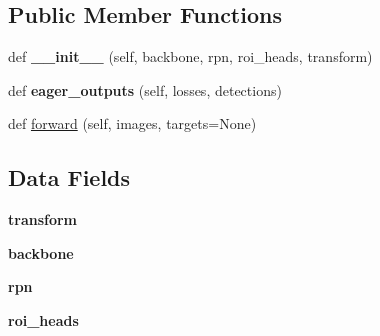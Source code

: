 \subsection*{Public Member Functions}
\begin{DoxyCompactItemize}
\item 
\mbox{\label{classtorchvision_1_1models_1_1detection_1_1generalized__rcnn_1_1GeneralizedRCNN_a2ca3aebf69f68a2e0c639a1c7cdb8de5}} 
def {\bfseries \+\_\+\+\_\+init\+\_\+\+\_\+} (self, backbone, rpn, roi\+\_\+heads, transform)
\item 
\mbox{\label{classtorchvision_1_1models_1_1detection_1_1generalized__rcnn_1_1GeneralizedRCNN_a98edb0650d7ad9e5ee2c79c5eaf8cf51}} 
def {\bfseries eager\+\_\+outputs} (self, losses, detections)
\item 
def \hyperlink{classtorchvision_1_1models_1_1detection_1_1generalized__rcnn_1_1GeneralizedRCNN_a7d27936056f516d9a310f5b0746f7cda}{forward} (self, images, targets=None)
\end{DoxyCompactItemize}
\subsection*{Data Fields}
\begin{DoxyCompactItemize}
\item 
\mbox{\label{classtorchvision_1_1models_1_1detection_1_1generalized__rcnn_1_1GeneralizedRCNN_a6ecdabab343537afe9fd205816abb346}} 
{\bfseries transform}
\item 
\mbox{\label{classtorchvision_1_1models_1_1detection_1_1generalized__rcnn_1_1GeneralizedRCNN_ae79f5e1302b602e27c572afd57b9bb87}} 
{\bfseries backbone}
\item 
\mbox{\label{classtorchvision_1_1models_1_1detection_1_1generalized__rcnn_1_1GeneralizedRCNN_afc01b47bfa19754541f8add61b7dea42}} 
{\bfseries rpn}
\item 
\mbox{\label{classtorchvision_1_1models_1_1detection_1_1generalized__rcnn_1_1GeneralizedRCNN_a3e3a47a6548fcf617aa75faf2d0279db}} 
{\bfseries roi\+\_\+heads}
\end{DoxyCompactItemize}


